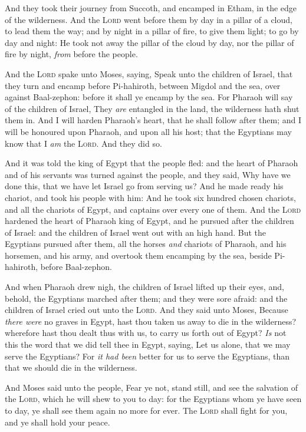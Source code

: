 \documentclass[11pt,letterpaper,oneside]{memoir}
\begin{document}
And they took their journey from Succoth, and encamped in Etham, in the
edge of the wilderness. And the \textsc{Lord} went before them by day in
a pillar of a cloud, to lead them the way; and by night in a pillar of
fire, to give them light; to go by day and night: He took not away the
pillar of the cloud by day, nor the pillar of fire by night, \emph{from}
before the people.

And the \textsc{Lord} spake unto Moses, saying, Speak unto the children
of Israel, that they turn and encamp before Pi-hahiroth, between Migdol
and the sea, over against Baal-zephon: before it shall ye encamp by the
sea. For Pharaoh will say of the children of Israel, They \emph{are}
entangled in the land, the wilderness hath shut them in. And I will
harden Pharaoh's heart, that he shall follow after them; and I will be
honoured upon Pharaoh, and upon all his host; that the Egyptians may
know that I \emph{am} the \textsc{Lord}. And they did so.

And it was told the king of Egypt that the people fled: and the heart of
Pharaoh and of his servants was turned against the people, and they
said, Why have we done this, that we have let Israel go from serving us?
And he made ready his chariot, and took his people with him: And he took
six hundred chosen chariots, and all the chariots of Egypt, and captains
over every one of them. And the \textsc{Lord} hardened the heart of
Pharaoh king of Egypt, and he pursued after the children of Israel: and
the children of Israel went out with an high hand. But the Egyptians
pursued after them, all the horses \emph{and} chariots of Pharaoh, and
his horsemen, and his army, and overtook them encamping by the sea,
beside Pi-hahiroth, before Baal-zephon.

And when Pharaoh drew nigh, the children of Israel lifted up their eyes,
and, behold, the Egyptians marched after them; and they were sore
afraid: and the children of Israel cried out unto the \textsc{Lord}. And
they said unto Moses, Because \emph{there were} no graves in Egypt, hast
thou taken us away to die in the wilderness? wherefore hast thou dealt
thus with us, to carry us forth out of Egypt? \emph{Is} not this the
word that we did tell thee in Egypt, saying, Let us alone, that we may
serve the Egyptians? For \emph{it had been} better for us to serve the
Egyptians, than that we should die in the wilderness.

And Moses said unto the people, Fear ye not, stand still, and see the
salvation of the \textsc{Lord}, which he will shew to you to day: for
the Egyptians whom ye have seen to day, ye shall see them again no more
for ever. The \textsc{Lord} shall fight for you, and ye shall hold your
peace.
\end{document}
